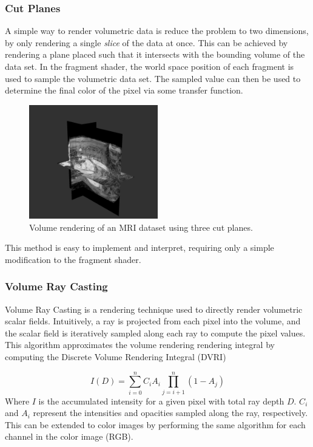 \documentclass{article}
\begin{document}
\subsubsection{Cut Planes}
A simple way to render volumetric data is reduce the problem to two dimensions, by only rendering a single \textit{slice} of the data
at once. This can be achieved by rendering a plane placed such that it intersects with the bounding volume of the 
data set. In the fragment shader, the world space position of each fragment is used to sample the volumetric data set.
The sampled value can then be used to determine the final color of the pixel via some transfer function.
\begin{figure}[tbh!]
    \centering
    \includegraphics[width=0.5\textwidth]{images/CutPlanes.png}
    \caption{Volume rendering of an MRI dataset using three cut planes.}
    \label{fig:cutPlanes}
\end{figure}


This method is easy to implement and interpret, requiring only a simple modification to the fragment shader. 

\subsubsection{Volume Ray Casting}
Volume Ray Casting is a rendering technique used to directly render volumetric scalar fields.
Intuitively, a ray is projected from each pixel into the volume,
and the scalar field is iteratively sampled along each ray to compute the pixel values.
This algorithm approximates the volume rendering rendering integral by computing the Discrete Volume Rendering Integral (DVRI) 

$$ I(D) = \sum_{i=0}^n C_iA_i\prod_{j=i+1}^{n}(1-A_j)$$
Where $I$ is the accumulated intensity for a given pixel with total ray depth $D$.
$C_i$ and $A_i$ represent the intensities and opacities sampled along the ray, respectively. This
can be extended to color images by performing the same algorithm for each channel in the color image (RGB).
\end{document}

